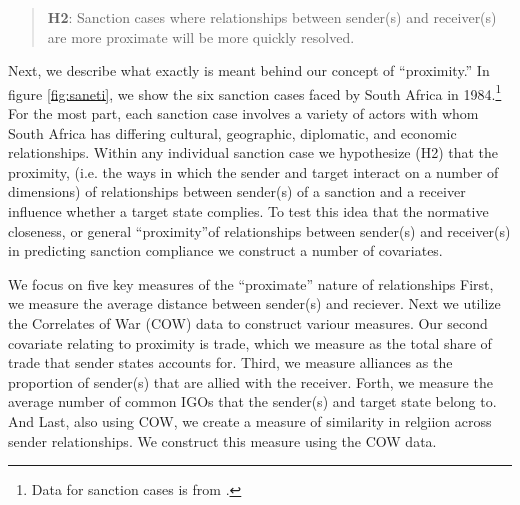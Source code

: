 \begin{quote}
	\textbf{H2}: Sanction cases where relationships between sender(s) and receiver(s) are more proximate will be more quickly resolved.
\end{quote}

 Next, we describe what exactly is meant behind our concept of ``proximity.'' In figure \ref{fig:saneti}, we show the six sanction cases faced by South Africa in 1984.\footnote{Data for sanction cases is from \citet{morgan2009threat}.} For the most part, each sanction case involves a variety of actors with whom South Africa has differing cultural, geographic, diplomatic, and economic relationships. Within any individual sanction case we hypothesize (H2) that the proximity, (i.e. the ways in which the sender and target interact on a number of dimensions) of relationships between sender(s) of a sanction and a receiver influence whether a target state complies. To test this idea that the normative closeness, or general ``proximity''of relationships between sender(s) and receiver(s) in predicting sanction compliance we construct a number of covariates. 

We focus on five key measures of the ``proximate'' nature of relationships First, we measure the average distance between sender(s) and reciever. Next we utilize the Correlates of War (COW) data to construct variour measures. Our second covariate relating to proximity is trade, which we measure as the total share of trade that sender states accounts for. Third, we measure alliances as the proportion of sender(s) that are allied with the receiver. Forth, we measure the average number of common IGOs that the sender(s) and target state belong to. And Last, also using COW, we create a measure of similarity in relgiion across sender relationships.
 We construct this measure using the COW data. 


  
